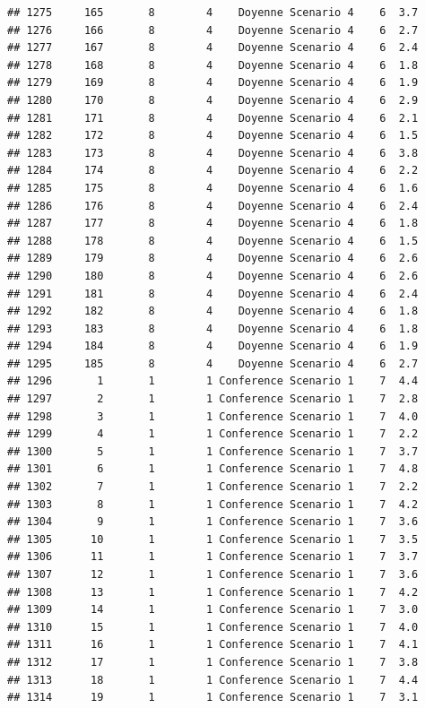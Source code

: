 \documentclass[
]{article}
\begin{document}
\begin{verbatim}
## 1275     165       8        4    Doyenne Scenario 4    6  3.7
## 1276     166       8        4    Doyenne Scenario 4    6  2.7
## 1277     167       8        4    Doyenne Scenario 4    6  2.4
## 1278     168       8        4    Doyenne Scenario 4    6  1.8
## 1279     169       8        4    Doyenne Scenario 4    6  1.9
## 1280     170       8        4    Doyenne Scenario 4    6  2.9
## 1281     171       8        4    Doyenne Scenario 4    6  2.1
## 1282     172       8        4    Doyenne Scenario 4    6  1.5
## 1283     173       8        4    Doyenne Scenario 4    6  3.8
## 1284     174       8        4    Doyenne Scenario 4    6  2.2
## 1285     175       8        4    Doyenne Scenario 4    6  1.6
## 1286     176       8        4    Doyenne Scenario 4    6  2.4
## 1287     177       8        4    Doyenne Scenario 4    6  1.8
## 1288     178       8        4    Doyenne Scenario 4    6  1.5
## 1289     179       8        4    Doyenne Scenario 4    6  2.6
## 1290     180       8        4    Doyenne Scenario 4    6  2.6
## 1291     181       8        4    Doyenne Scenario 4    6  2.4
## 1292     182       8        4    Doyenne Scenario 4    6  1.8
## 1293     183       8        4    Doyenne Scenario 4    6  1.8
## 1294     184       8        4    Doyenne Scenario 4    6  1.9
## 1295     185       8        4    Doyenne Scenario 4    6  2.7
## 1296       1       1        1 Conference Scenario 1    7  4.4
## 1297       2       1        1 Conference Scenario 1    7  2.8
## 1298       3       1        1 Conference Scenario 1    7  4.0
## 1299       4       1        1 Conference Scenario 1    7  2.2
## 1300       5       1        1 Conference Scenario 1    7  3.7
## 1301       6       1        1 Conference Scenario 1    7  4.8
## 1302       7       1        1 Conference Scenario 1    7  2.2
## 1303       8       1        1 Conference Scenario 1    7  4.2
## 1304       9       1        1 Conference Scenario 1    7  3.6
## 1305      10       1        1 Conference Scenario 1    7  3.5
## 1306      11       1        1 Conference Scenario 1    7  3.7
## 1307      12       1        1 Conference Scenario 1    7  3.6
## 1308      13       1        1 Conference Scenario 1    7  4.2
## 1309      14       1        1 Conference Scenario 1    7  3.0
## 1310      15       1        1 Conference Scenario 1    7  4.0
## 1311      16       1        1 Conference Scenario 1    7  4.1
## 1312      17       1        1 Conference Scenario 1    7  3.8
## 1313      18       1        1 Conference Scenario 1    7  4.4
## 1314      19       1        1 Conference Scenario 1    7  3.1

\end{verbatim}
\end{document}
